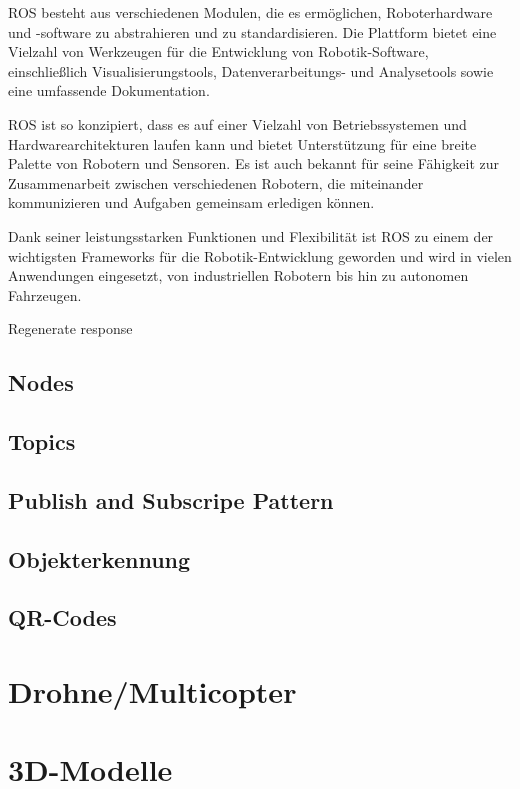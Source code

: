 ROS besteht aus verschiedenen Modulen, die es ermöglichen, Roboterhardware und -software zu abstrahieren und zu standardisieren. Die Plattform bietet eine Vielzahl von Werkzeugen für die Entwicklung von Robotik-Software, einschließlich Visualisierungstools, Datenverarbeitungs- und Analysetools sowie eine umfassende Dokumentation.

ROS ist so konzipiert, dass es auf einer Vielzahl von Betriebssystemen und Hardwarearchitekturen laufen kann und bietet Unterstützung für eine breite Palette von Robotern und Sensoren. Es ist auch bekannt für seine Fähigkeit zur Zusammenarbeit zwischen verschiedenen Robotern, die miteinander kommunizieren und Aufgaben gemeinsam erledigen können.

Dank seiner leistungsstarken Funktionen und Flexibilität ist ROS zu einem der wichtigsten Frameworks für die Robotik-Entwicklung geworden und wird in vielen Anwendungen eingesetzt, von industriellen Robotern bis hin zu autonomen Fahrzeugen.



Regenerate response

    \subsection{Nodes}

    \subsection{Topics}

    \subsection{Publish and Subscripe Pattern}

    \subsection{Objekterkennung}

    \subsection{QR-Codes}

\section{Drohne/Multicopter}

\section{3D-Modelle}

